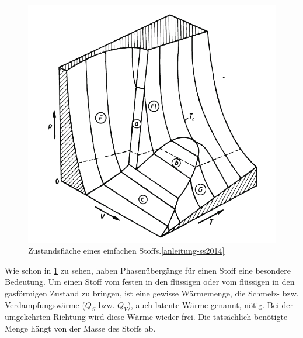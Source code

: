 \begin{figure}
	\centering
	\includegraphics[scale=0.75]{res/Zustandsflaeche.pdf}
	\caption{Zustandsfläche eines einfachen Stoffs.\cref{anleitung-ss2014} \label{fig:zustandsfläche}}
\end{figure}

Wie schon in \cref{fig:zustandsfläche} zu sehen, haben Phasenübergänge für einen Stoff eine besondere Bedeutung. Um einen Stoff vom festen in den flüssigen oder vom flüssigen in den gasförmigen Zustand zu bringen, ist eine gewisse Wärmemenge, die Schmelz- bzw. Verdampfungswärme ($Q_S$ bzw. $Q_V$), auch latente Wärme genannt, nötig. Bei der umgekehrten Richtung wird diese Wärme wieder frei. Die tatsächlich benötigte Menge hängt von der Masse des Stoffs ab.


